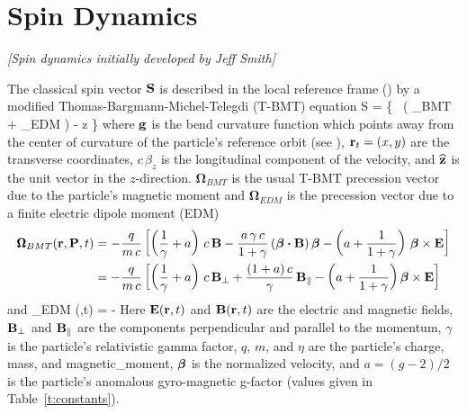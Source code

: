 \section{Spin Dynamics}
\label{s:spin.dyn}

\textit{\large [Spin dynamics initially developed by Jeff Smith]}

The classical spin vector ${\bf S}$ is described in the local reference
frame () by a modified Thomas-Bargmann-Michel-Telegdi
(T-BMT) equation\cite{b:spin}
\Begineq
   \Bf S = 
  \left\{  \, 
  \left( {\pmb\Omega}_{BMT} + {\pmb\Omega}_{EDM} \right) - 
  \bfg \times \bfhat z \right\} \times {}
  \label{tbmt}
\Endeq
where ${\bf g}$ is the bend curvature function which points away from the center of curvature
of the particle's reference orbit (see ), ${\bf r}_t = (x, y)$ are the
transverse coordinates, $c \, \beta_z$ is the longitudinal component of the velocity, and
${\widehat{\bf z}}$ is the unit vector in the $z$-direction. $\pmb\Omega_{BMT}$ is the usual T-BMT
precession vector due to the particle's magnetic moment and $\pmb\Omega_{EDM}$ is the
precession vector due to a finite electric dipole moment (EDM) \cite{b:silenko}
\begin{align}
  {\pmb\Omega}_{BMT} (\mathbf{r,P},t) &= 
    - \frac{q}{m \, c} \left[ 
    \left(\frac{1}{\gamma} + a \right) \, c \, {\bf B} -
    \frac{a \, \gamma \, c}{1 + \gamma} \, ( \boldsymbol{\beta} \mathbin{\boldsymbol{\cdot}} {\bf B} ) \, \boldsymbol{\beta} -
    \left( a + \frac{1}{1 + \gamma} \right) \, \mathbf{\boldsymbol{\beta} \times  E} 
    \right] \\
  &= - \frac{q}{m \, c} \left[ 
    \left( \frac{1}{\gamma} + a \right) \, c \, {\bf B}_{\perp} +
    \frac{(1 + a) \, c}{\gamma} \, {\bf B}_\parallel -
    \left( a + \frac{1}{1 + \gamma} \right) \mathbf{\boldsymbol{\beta} \times E} 
    \right] \nonumber
\end{align}
and
\Begineq
  {\pmb\Omega}_{EDM} (,t) = 
  -  
\Endeq
Here ${\bf E} ({\bf r} ,t)$ and ${\bf B} ({\bf r} ,t)$ are the electric and magnetic fields, ${\bf B}_\perp$ and ${\bf B}_\parallel$ are the components perpendicular and parallel to the
momentum, $\gamma$ is the particle's relativistic gamma factor, $q$, $m$, and $\eta$ are
the particle's charge, mass, and magnetic_moment, $\boldsymbol{\beta}$ is the normalized
velocity, and $a = (g-2)/2$ is the particle's anomalous gyro-magnetic g-factor (values
given in Table~\ref{t:constants}).

